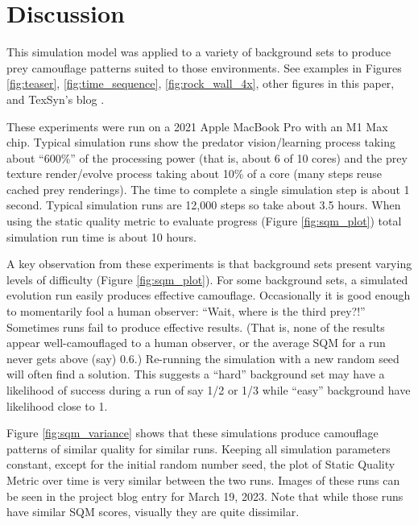 \documentclass[letterpaper]{article}
\begin{document}
\section{Discussion}
\label{sec:discussion}
This simulation model was applied to a variety of background sets to produce prey camouflage patterns suited to those environments. See examples in Figures \ref{fig:teaser}, \ref{fig:time_sequence}, \ref{fig:rock_wall_4x}, other figures in this paper, and TexSyn's blog \citep{reynolds_texsyn_blog_2023}.
\par
These experiments were run on a 2021 Apple MacBook Pro with an M1 Max chip. Typical simulation runs show the predator vision/learning process taking about “600\%” of the processing power (that is, about 6 of 10 cores) and the prey texture render/evolve process taking about 10\% of a core (many steps reuse cached prey renderings). The time to complete a single simulation step is about 1 second. Typical simulation runs are 12,000 steps so take about 3.5 hours. When using the static quality metric to evaluate progress (Figure \ref{fig:sqm_plot}) total simulation run time is about 10 hours.
\par
A key observation from these experiments is that background sets present varying levels of difficulty (Figure \ref{fig:sqm_plot}). For some background sets, a simulated evolution run easily produces effective camouflage. Occasionally it is good enough to momentarily fool a human observer: “Wait, where is the third prey?!” Sometimes runs fail to produce effective results. (That is, none of the results appear well-camouflaged to a human observer, or the average SQM for a run never gets above (say) 0.6.) Re-running the simulation with a new random seed will often find a solution. This suggests a “hard” background set may have a likelihood of success during a run of say 1/2 or 1/3 while “easy” background have likelihood close to 1.
\par
Figure \ref{fig:sqm_variance} shows that these simulations produce  camouflage patterns of similar quality for similar runs. Keeping all simulation parameters constant, except for the initial random number seed, the plot of Static Quality Metric over time is very similar between the two runs. Images of these runs can be seen in the project blog \citep{reynolds_texsyn_blog_2023} entry for March 19, 2023. Note that while those runs have similar SQM scores, visually they are quite dissimilar.
\par

\end{document}
